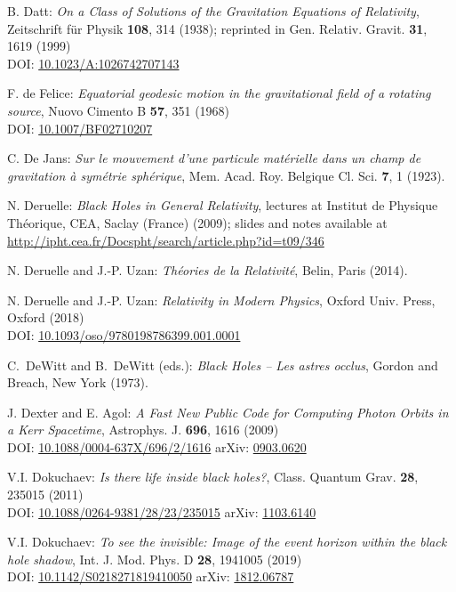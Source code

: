 \begin{thebibliography}{123}
B. Datt:
{\em On a Class of Solutions of the Gravitation Equations of Relativity},
Zeitschrift für Physik {\bf 108}, 314 (1938);
reprinted in Gen. Relativ. Gravit. {\bf 31}, 1619 (1999)\\
DOI: \href{https://doi.org/10.1023/A:1026742707143}{10.1023/A:1026742707143}

F. de Felice:
{\em Equatorial geodesic motion in the gravitational field of a rotating source},
Nuovo Cimento B {\bf 57}, 351 (1968)\\
DOI: \href{https://doi.org/10.1007/BF02710207}{10.1007/BF02710207}

C. De Jans:
\emph{Sur le mouvement d'une particule matérielle dans un champ de gravitation à symétrie sphérique},
Mem. Acad. Roy. Belgique Cl. Sci. {\bf 7}, 1 (1923).

N. Deruelle: {\em Black Holes in General Relativity}, lectures at
Institut de Physique Théorique, CEA, Saclay (France) (2009); slides and notes
available at \\
\url{http://ipht.cea.fr/Docspht/search/article.php?id=t09/346}

N. Deruelle and J.-P. Uzan: {\em Th\'eories de la Relativit\'e},
Belin, Paris (2014).

N. Deruelle and J.-P. Uzan: {\em Relativity in Modern Physics},
Oxford Univ. Press, Oxford (2018)\\
DOI: \href{https://doi.org/10.1093/oso/9780198786399.001.0001}{10.1093/oso/9780198786399.001.0001}

C.~DeWitt and B.~DeWitt (eds.):
{\em Black Holes -- Les astres occlus},
Gordon and Breach, New York (1973).

J. Dexter and E. Agol:
{\em A Fast New Public Code for Computing Photon Orbits in a Kerr Spacetime},
Astrophys. J. {\bf 696}, 1616 (2009)\\
DOI: \href{https://doi.org/10.1088/0004-637X/696/2/1616}{10.1088/0004-637X/696/2/1616}\hfill
arXiv: \href{https://arxiv.org/abs/0903.0620}{0903.0620}

V.I. Dokuchaev: {\em Is there life inside black holes?},
Class. Quantum Grav. {\bf 28}, 235015 (2011)\\
DOI: \href{https://doi.org/10.1088/0264-9381/28/23/235015}{10.1088/0264-9381/28/23/235015}\hfill
arXiv: \href{https://arxiv.org/abs/1103.6140}{1103.6140}

V.I. Dokuchaev: {\em To see the invisible: Image of the event horizon within the black hole shadow},
Int. J. Mod. Phys. D {\bf 28}, 1941005 (2019)\\
DOI: \href{https://doi.org/10.1142/S0218271819410050}{10.1142/S0218271819410050}\hfill
arXiv: \href{https://arxiv.org/abs/1812.06787}{1812.06787}


\end{thebibliography}
